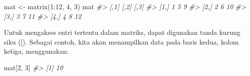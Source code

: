 \documentclass[
]{article}
\newenvironment{Shaded}{\begin{snugshade}}{\end{snugshade}}
\newcommand{\CommentTok}[1]{\textcolor[rgb]{0.56,0.35,0.01}{\textit{#1}}}
\newcommand{\DecValTok}[1]{\textcolor[rgb]{0.00,0.00,0.81}{#1}}
\newcommand{\FunctionTok}[1]{\textcolor[rgb]{0.00,0.00,0.00}{#1}}
\newcommand{\NormalTok}[1]{#1}
\newcommand{\OtherTok}[1]{\textcolor[rgb]{0.56,0.35,0.01}{#1}}
\newcommand{\SpecialCharTok}[1]{\textcolor[rgb]{0.00,0.00,0.00}{#1}}
\begin{document}
\begin{Shaded}
\begin{Highlighting}[]
\NormalTok{mat }\OtherTok{\textless{}{-}} \FunctionTok{matrix}\NormalTok{(}\DecValTok{1}\SpecialCharTok{:}\DecValTok{12}\NormalTok{, }\DecValTok{4}\NormalTok{, }\DecValTok{3}\NormalTok{) }
\NormalTok{mat }
\CommentTok{\#\textgreater{}      [,1] [,2] [,3] }
\CommentTok{\#\textgreater{} [1,]   1    5    9 }
\CommentTok{\#\textgreater{} [2,]   2    6   10 }
\CommentTok{\#\textgreater{} [3,]   3    7   11 }
\CommentTok{\#\textgreater{} [4,]   4    8   12 }
\end{Highlighting}
\end{Shaded}

Untuk mengakses entri tertentu dalam matriks, dapat digunakan tanda
kurung siku ({[}). Sebagai contoh, kita akan menampilkan data pada baris
kedua, kolom ketiga, menggunakan:

\begin{Shaded}
\begin{Highlighting}[]
\NormalTok{mat[}\DecValTok{2}\NormalTok{, }\DecValTok{3}\NormalTok{] }
\CommentTok{\#\textgreater{} [1] 10 }
\end{Highlighting}
\end{Shaded}
\end{document}
